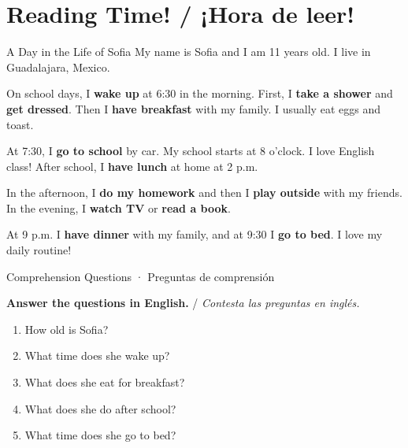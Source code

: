 
\section{Reading Time! / ¡Hora de leer!}

\begin{readingbox}{A Day in the Life of Sofia}
My name is Sofia and I am 11 years old. I live in Guadalajara, Mexico.

On school days, I \textbf{wake up} at 6:30 in the morning. First, I \textbf{take a shower} and \textbf{get dressed}. Then I \textbf{have breakfast} with my family. I usually eat eggs and toast.

At 7:30, I \textbf{go to school} by car. My school starts at 8 o'clock. I love English class! After school, I \textbf{have lunch} at home at 2 p.m.

In the afternoon, I \textbf{do my homework} and then I \textbf{play outside} with my friends. In the evening, I \textbf{watch TV} or \textbf{read a book}.

At 9 p.m. I \textbf{have dinner} with my family, and at 9:30 I \textbf{go to bed}. I love my daily routine!
\end{readingbox}

\vspace{14pt}

\begin{activity}{Comprehension Questions · Preguntas de comprensión}

\textbf{Answer the questions in English.} / \textit{Contesta las preguntas en inglés.}

\medskip
\begin{enumerate}
  \item How old is Sofia?

        \answerline[10cm]

  \item What time does she wake up?

        \answerline[10cm]

  \item What does she eat for breakfast?

        \answerline[10cm]

  \item What does she do after school?

        \answerline[10cm]

  \item What time does she go to bed?

        \answerline[10cm]
\end{enumerate}
\end{activity}

